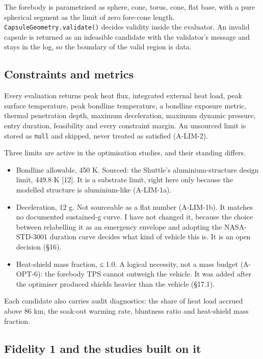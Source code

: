 \documentclass[
  a4paper,
  11pt]{article}
\providecommand{\tightlist}{%
  \setlength{\itemsep}{0pt}\setlength{\parskip}{0pt}}
\begin{document}
The forebody is parametrised as sphere, cone, torus, cone, flat base,
with a pure spherical segment as the limit of zero fore-cone length.
\texttt{CapsuleGeometry.validate()} decides validity inside the
evaluator. An invalid capsule is returned as an infeasible candidate
with the validator's message and stays in the log, so the boundary of
the valid region is data.

\subsection{Constraints and metrics}

Every evaluation returns peak heat flux, integrated external heat load,
peak surface temperature, peak bondline temperature, a bondline exposure
metric, thermal penetration depth, maximum deceleration, maximum dynamic
pressure, entry duration, feasibility and every constraint margin. An
unsourced limit is stored as \texttt{null} and skipped, never treated as
satisfied (A-LIM-2).

Three limits are active in the optimisation studies, and their standing
differs.

\begin{itemize}
\tightlist
\item
  Bondline allowable, 450 K. Sourced: the Shuttle's aluminium-structure
  design limit, 449.8 K {[}12{]}. It is a substrate limit, right here
  only because the modelled structure is aluminium-like (A-LIM-1a).
\item
  Deceleration, 12 g. Not sourceable as a flat number (A-LIM-1b). It
  matches no documented sustained-g curve. I have not changed it,
  because the choice between relabelling it as an emergency envelope and
  adopting the NASA-STD-3001 duration curve decides what kind of vehicle
  this is. It is an open decision (§16).
\item
  Heat-shield mass fraction, ≤ 1.0. A logical necessity, not a mass
  budget (A-OPT-6): the forebody TPS cannot outweigh the vehicle. It was
  added after the optimiser produced shields heavier than the vehicle
  (§17.1).
\end{itemize}

Each candidate also carries audit diagnostics: the share of heat load
accrued above 86 km, the soak-out warming rate, bluntness ratio and
heat-shield mass fraction.

\subsection{Fidelity 1 and the studies built on it}
\end{document}
